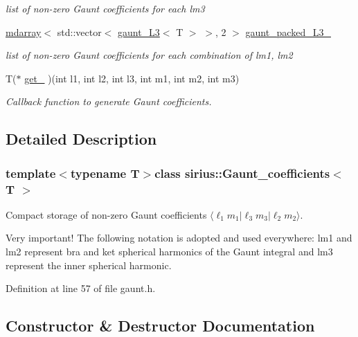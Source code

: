 \begin{DoxyCompactItemize}
\begin{DoxyCompactList}\small\item\em list of non-\/zero Gaunt coefficients for each lm3 \end{DoxyCompactList}\item 
\hyperlink{classsddk_1_1mdarray}{mdarray}$<$ std\+::vector$<$ \hyperlink{structsirius_1_1gaunt___l3}{gaunt\+\_\+\+L3}$<$ T $>$ $>$, 2 $>$ \hyperlink{classsirius_1_1_gaunt__coefficients_ae81678a8f6226e3f1d92037ad5f2e1ad}{gaunt\+\_\+packed\+\_\+\+L3\+\_\+}
\begin{DoxyCompactList}\small\item\em list of non-\/zero Gaunt coefficients for each combination of lm1, lm2 \end{DoxyCompactList}\item 
T($\ast$ \hyperlink{classsirius_1_1_gaunt__coefficients_a961b21cb591368c29d088526bae2f535}{get\+\_\+} )(int l1, int l2, int l3, int m1, int m2, int m3)
\begin{DoxyCompactList}\small\item\em Callback function to generate Gaunt coefficients. \end{DoxyCompactList}\end{DoxyCompactItemize}


\subsection{Detailed Description}
\subsubsection*{template$<$typename T$>$class sirius\+::\+Gaunt\+\_\+coefficients$<$ T $>$}

Compact storage of non-\/zero Gaunt coefficients $ \langle \ell_1 m_1 | \ell_3 m_3 | \ell_2 m_2 \rangle $. 

Very important! The following notation is adopted and used everywhere\+: lm1 and lm2 represent \textquotesingle{}bra\textquotesingle{} and \textquotesingle{}ket\textquotesingle{} spherical harmonics of the Gaunt integral and lm3 represent the inner spherical harmonic. 

Definition at line 57 of file gaunt.\+h.



\subsection{Constructor \& Destructor Documentation}
\hypertarget{classsirius_1_1_gaunt__coefficients_ae2eee44a241029be94264e9c8b537fd4}{}
